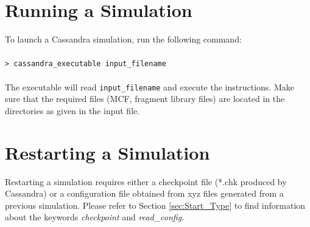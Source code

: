 %

\section{Running a Simulation}

To launch a Cassandra simulation, run the following command: \\ \\
%
\texttt{> cassandra\_executable input\_filename} \\ \\
%
The executable will read \texttt{input\_filename} and execute the instructions. Make sure that the required files (MCF, fragment library files) are located in the directories as given in the input file.

\section{Restarting a Simulation}
Restarting a simulation requires either a checkpoint file (*.chk produced
by Cassandra) or a configuration file obtained from xyz files generated
from a previous simulation. Please refer to Section \ref{sec:Start_Type}
to find information about the keywords \textit{checkpoint} and \textit{read\_config}. 


